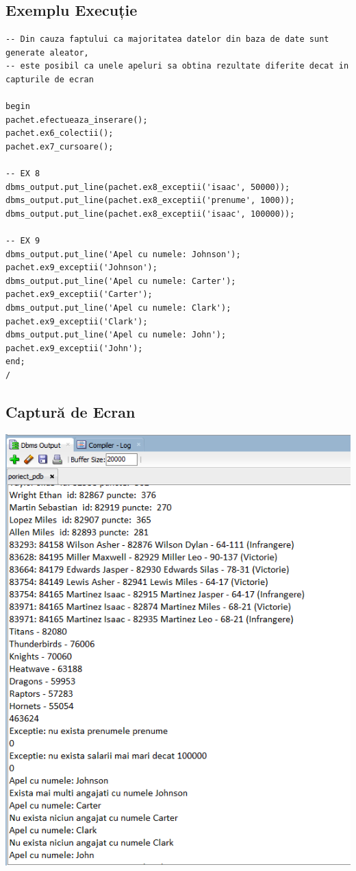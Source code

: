 \documentclass{article}
\begin{document}
\pagebreak
\subsection{Exemplu Execuție}
\begin{lstlisting}
-- Din cauza faptului ca majoritatea datelor din baza de date sunt generate aleator, 
-- este posibil ca unele apeluri sa obtina rezultate diferite decat in capturile de ecran

begin
pachet.efectueaza_inserare();
pachet.ex6_colectii();
pachet.ex7_cursoare();

-- EX 8
dbms_output.put_line(pachet.ex8_exceptii('isaac', 50000));
dbms_output.put_line(pachet.ex8_exceptii('prenume', 1000));
dbms_output.put_line(pachet.ex8_exceptii('isaac', 100000));

-- EX 9
dbms_output.put_line('Apel cu numele: Johnson');
pachet.ex9_exceptii('Johnson');
dbms_output.put_line('Apel cu numele: Carter');
pachet.ex9_exceptii('Carter');
dbms_output.put_line('Apel cu numele: Clark');
pachet.ex9_exceptii('Clark');
dbms_output.put_line('Apel cu numele: John');
pachet.ex9_exceptii('John');
end;
/

\end{lstlisting}

\subsection{Captură de Ecran}
\includegraphics[width=40em, keepaspectratio]{pachet_executie}
\pagebreak
\end{document}
